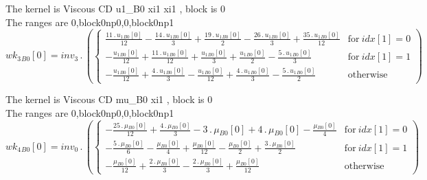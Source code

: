 \documentclass{article}
\begin{document}
\noindent The kernel is Viscous CD u1_B0 xi1 xi1 , block is 0\\\noindent The ranges are 0,block0np0,0,block0np1\\\begin{dmath}{wk_{3}{_{B0}}}[{0}] = inv_3 \,.\, \left(\begin{cases} \frac{11 \,.\, {u_{1}{_{B0}}}[{0}]}{12} - \frac{14 \,.\, {u_{1}{_{B0}}}[{0}]}{3} + \frac{19 \,.\, {u_{1}{_{B0}}}[{0}]}{2} - \frac{26 \,.\, {u_{1}{_{B0}}}[{0}]}{3} + \frac{35 \,.\, 
{u_{1}{_{B0}}}[{0}]}{12} & \text{for}\: {idx}[{1}] = 0 \\- \frac{{u_{1}{_{B0}}}[{0}]}{12} + \frac{11 \,.\, {u_{1}{_{B0}}}[{0}]}{12} + \frac{{u_{1}{_{B0}}}[{0}]}{3} + \frac{{u_{1}{_{B0}}}[{0}]}{2} - \frac{5 \,.\, {u_{1}{_{B0}}}[{0}]}{3} & \text{for}\: 
{idx}[{1}] = 1 \\- \frac{{u_{1}{_{B0}}}[{0}]}{12} + \frac{4 \,.\, {u_{1}{_{B0}}}[{0}]}{3} - \frac{{u_{1}{_{B0}}}[{0}]}{12} + \frac{4 \,.\, {u_{1}{_{B0}}}[{0}]}{3} - \frac{5 \,.\, {u_{1}{_{B0}}}[{0}]}{2} & \text{otherwise} 
\end{cases}\right)\end{dmath}

\noindent The kernel is Viscous CD mu_B0 xi1 , block is 0\\\noindent The ranges are 0,block0np0,0,block0np1\\\begin{dmath}{wk_{4}{_{B0}}}[{0}] = inv_0 \,.\, \left(\begin{cases} - \frac{25 \,.\, {\mu{_{B0}}}[{0}]}{12} + \frac{4 \,.\, {\mu{_{B0}}}[{0}]}{3} - 3 \,.\, {\mu{_{B0}}}[{0}] + 4 \,.\, {\mu{_{B0}}}[{0}] - \frac{{\mu{_{B0}}}[{0}]}{4} & \text{for}\: 
{idx}[{1}] = 0 \\- \frac{5 \,.\, {\mu{_{B0}}}[{0}]}{6} - \frac{{\mu{_{B0}}}[{0}]}{4} + \frac{{\mu{_{B0}}}[{0}]}{12} - \frac{{\mu{_{B0}}}[{0}]}{2} + \frac{3 \,.\, {\mu{_{B0}}}[{0}]}{2} & \text{for}\: {idx}[{1}] = 1 \\- \frac{{\mu{_{B0}}}[{0}]}{12} + 
\frac{2 \,.\, {\mu{_{B0}}}[{0}]}{3} - \frac{2 \,.\, {\mu{_{B0}}}[{0}]}{3} + \frac{{\mu{_{B0}}}[{0}]}{12} & \text{otherwise} \end{cases}\right)\end{dmath}
\end{document}
